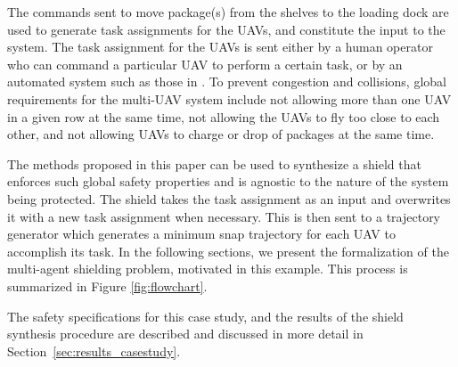 The commands sent to move package(s) from the shelves to the loading dock are used to generate task assignments for the UAVs, and constitute the input to the system. The task assignment for the UAVs is sent either by a human operator who can command a particular UAV to perform a certain task, or by an automated system such as those in \cite{olivo2016method,kalyan2015automated}. To prevent congestion and collisions, global requirements for the multi-UAV system include not allowing more than one UAV in a given row at the same time, not allowing the UAVs to fly too close to each other, and not allowing UAVs to charge or drop of packages at the same time. 

The methods proposed in this paper can be used to synthesize a shield that enforces such  global safety properties and is agnostic to the nature of the system being protected. The shield takes the task assignment as an input and overwrites it with a new task assignment when necessary.  This is then sent to a trajectory generator which generates a minimum snap trajectory for each UAV to accomplish its task. In the following sections, we present the formalization of the multi-agent shielding problem, motivated in this example.
This process is summarized in Figure \ref{fig:flowchart}. 
 
 The safety specifications for this case study, and the results of the shield synthesis procedure are described and discussed in more detail in Section~\ref{sec:results_casestudy}.

